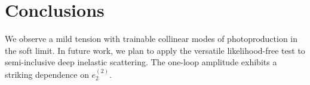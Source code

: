 \section{Conclusions}\label{sec:conclusions}

We observe a mild tension with trainable collinear modes of
photoproduction in the soft limit. In future work, we plan to apply the
versatile likelihood-free test to semi-inclusive deep inelastic
scattering. The one-loop amplitude exhibits a striking dependence on
$e_2^{(2)}$.

